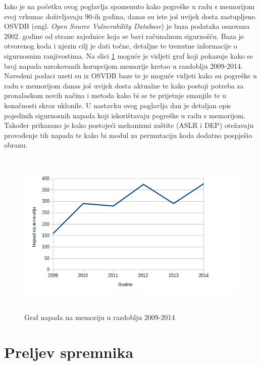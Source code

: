 \documentclass[times, utf8, diplomski, numeric]{fer}
\begin{document}
Iako je na početku ovog poglavlja spomenuto kako pogreške u radu
s memorijom svoj vrhunac doživljavaju 90-ih godina,
danas su iste još uvijek dosta zastupljene. OSVDB 
(engl. \emph{Open Source Vulnerability Database}) \citep{osvdb} je baza podataka			%
osnovana 2002. godine od strane zajednice koja se bavi računalnom
sigurnošću. Baza je otvorenog koda i njezin cilj je dati točne,
detaljne te trenutne informacije o sigurnosnim ranjivostima. Na
slici \ref{fig:mem_corruption} moguće je vidjeti graf koji
pokazuje kako se broj napada uzrokovanih korupcijom memorije
kretao u razdoblju 2009-2014. Navedeni podaci uzeti su iz OSVDB
baze te je moguće vidjeti kako su pogreške u radu s memorijom
 danas još uvijek dosta aktualne te kako postoji potreba
za pronalaskom novih načina i metoda kako bi se te prijetnje
smanjile te u konačnosti skroz uklonile. U nastavku ovog
poglavlja dan je detaljan opis pojedinih sigurnosnih napada koji
iskorištavaju pogreške u radu s memorijom. Također
prikazano je kako postojeći mehanizmi zaštite (ASLR i DEP) 
otežavaju provođenje tih napada te kako bi modul za permutaciju
koda dodatno pospješio obranu. 

\begin{figure}[!ht]
\centering
\setlength\fboxsep{0pt}
\setlength\fboxrule{0.5pt}
\includegraphics[width=12cm, height=8cm]{slike/memory_corruption}
\caption{Graf napada na memoriju u razdoblju 2009-2014}
\label{fig:mem_corruption} 
\end{figure} 

\section{Preljev spremnika}
\label{sct:bufferOverflow}
\end{document}
